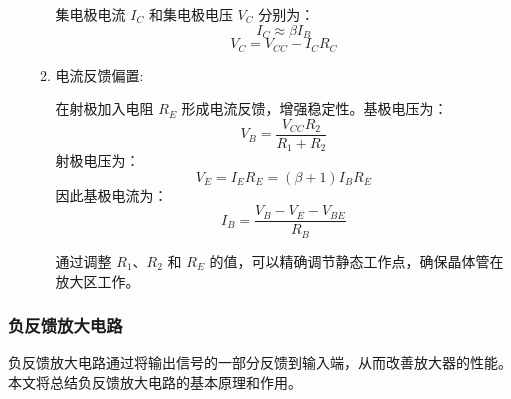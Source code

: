 \documentclass[dvipsnames, svgnames,a4paper,11pt]{article}
\begin{document}
\begin{enumerate}
\begin{enumerate}
					集电极电流 $I_C$ 和集电极电压 $V_C$ 分别为：
					\[
					I_C \approx \beta I_B
					\]
					\[
					V_C = V_{CC} - I_C R_C
					\]

				\item 电流反馈偏置:
					
					在射极加入电阻 $R_E$ 形成电流反馈，增强稳定性。基极电压为：
					\[
					V_B = \frac{V_{CC} R_2}{R_1 + R_2}
					\]
					射极电压为：
					\[
					V_E = I_E R_E = (\beta + 1) I_B R_E
					\]
					因此基极电流为：
					\[
					I_B = \frac{V_B - V_E - V_{BE}}{R_B}
					\]

					通过调整 $R_1$、$R_2$ 和 $R_E$ 的值，可以精确调节静态工作点，确保晶体管在放大区工作。
					
			
				
			\end{enumerate}

	\end{enumerate}

	\subsubsection{负反馈放大电路}

		负反馈放大电路通过将输出信号的一部分反馈到输入端，从而改善放大器的性能。本文将总结负反馈放大电路的基本原理和作用。
\end{document}
